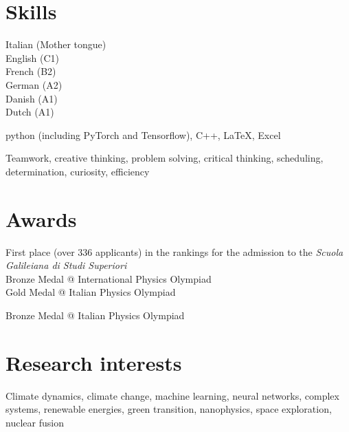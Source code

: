 \documentclass[11pt, a4 paper]{article}
\begin{document}


\section*{Skills}
  \begin{description}[style=multiline,leftmargin=3cm,align=right]
    \item[Languages]
      Italian (Mother tongue) \\
      English (C1) \\
      French (B2) \\
      German (A2) \\
      Danish (A1) \\
      Dutch (A1)
    \item[Software]
      python (including PyTorch and Tensorflow), C++, LaTeX, Excel
    \item[Transversal]
      Teamwork, creative thinking, problem solving, critical thinking, scheduling, determination, curiosity, efficiency
  \end{description}


\section*{Awards}
  \begin{description}[style=multiline,leftmargin=3cm,align=right]
    \item[2016]
      First place (over 336 applicants) in the rankings for the admission to the \emph{Scuola Galileiana di Studi Superiori} \\
      Bronze Medal @ International Physics Olympiad \\
      Gold Medal @ Italian Physics Olympiad
    \item[2015] Bronze Medal @ Italian Physics Olympiad
  \end{description}


\section*{Research interests}
  \begin{description}[style=multiline,leftmargin=3cm,align=right]
    \item[] Climate dynamics, climate change, machine learning, neural networks, complex systems, renewable energies, green transition, nanophysics, space exploration, nuclear fusion
  \end{description}
\end{document}
